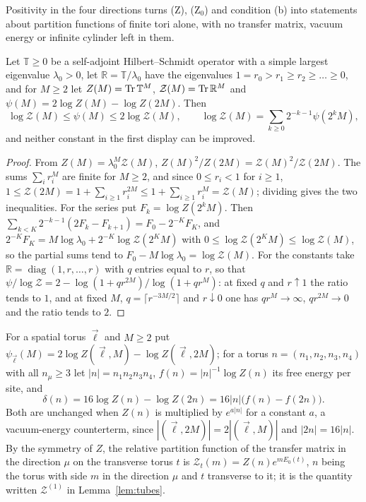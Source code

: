 Positivity in the four directions turns (Z), (Z$_0$) and condition (b) into
statements about partition functions of finite tori alone, with no transfer
matrix, vacuum energy or infinite cylinder left in them.

\begin{lemma}[doubling]\label{lem:doubling}
Let $\mathbb T\ge0$ be a self-adjoint Hilbert--Schmidt operator with a
simple largest eigenvalue $\lambda_0>0$, let $\mathbb R=\mathbb T/\lambda_0$
have the eigenvalues $1=r_0>r_1\ge r_2\ge\dots\ge0$, and for $M\ge2$ let
$Z(M)=\operatorname{Tr}\mathbb T^M$, $\mathcal Z(M)=\operatorname{Tr}\mathbb R^M$ and $\psi(M)=2\log
Z(M)-\log Z(2M)$. Then
\[
\log\mathcal Z(M)\le\psi(M)\le2\log\mathcal Z(M),\qquad
\log\mathcal Z(M)=\sum_{k\ge0}2^{-k-1}\psi(2^kM),
\]
and neither constant in the first display can be improved.
\end{lemma}

\begin{proof}
From $Z(M)=\lambda_0^M\mathcal Z(M)$, $Z(M)^2/Z(2M)=\mathcal Z(M)^2/
\mathcal Z(2M)$. The sums $\sum_ir_i^M$ are finite for $M\ge2$, and since
$0\le r_i<1$ for $i\ge1$, $1\le\mathcal Z(2M)=1+\sum_{i\ge1}r_i^{2M}\le1+
\sum_{i\ge1}r_i^M=\mathcal Z(M)$; dividing gives the two inequalities. For
the series put $F_k=\log Z(2^kM)$. Then $\sum_{k<K}2^{-k-1}(2F_k-F_{k+1})=
F_0-2^{-K}F_K$, and $2^{-K}F_K=M\log\lambda_0+2^{-K}\log\mathcal Z(2^KM)$
with $0\le\log\mathcal Z(2^KM)\le\log\mathcal Z(M)$, so the partial sums tend
to $F_0-M\log\lambda_0=\log\mathcal Z(M)$. For the constants take $\mathbb R=
\operatorname{diag}(1,r,\dots,r)$ with $q$ entries equal to $r$, so that
$\psi/\log\mathcal Z=2-\log(1+qr^{2M})/\log(1+qr^M)$: at fixed $q$ and $r
\uparrow1$ the ratio tends to $1$, and at fixed $M$, $q=\lceil r^{-3M/2}
\rceil$ and $r\downarrow0$ one has $qr^M\to\infty$, $qr^{2M}\to0$ and the
ratio tends to $2$.
\end{proof}

For a spatial torus $\vec\ell$ and $M\ge2$ put $\psi_{\vec\ell}(M)=2\log
Z(\vec\ell,M)-\log Z(\vec\ell,2M)$; for a torus $n=(n_1,n_2,n_3,n_4)$ with
all $n_\mu\ge3$ let $|n|=n_1n_2n_3n_4$, $f(n)=|n|^{-1}\log Z(n)$ its free
energy per site, and
\[
\delta(n)=16\log Z(n)-\log Z(2n)=16|n|\bigl(f(n)-f(2n)\bigr).
\]
Both are unchanged when $Z(n)$ is multiplied by $e^{a|n|}$ for a constant
$a$, a vacuum-energy counterterm, since $|(\vec\ell,2M)|=2|(\vec\ell,M)|$ and
$|2n|=16|n|$. By the symmetry of $Z$, the relative partition function of the
transfer matrix in the direction $\mu$ on the transverse torus $t$ is
$\mathcal Z_t(m)=Z(n)e^{mE_0(t)}$, $n$ being the torus with side $m$ in the
direction $\mu$ and $t$ transverse to it; it is the quantity written
$\mathcal Z^{(1)}$ in Lemma~\ref{lem:tubes}.

